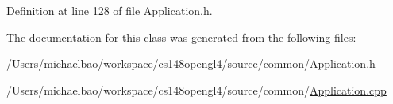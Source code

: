 Definition at line 128 of file Application.\+h.



The documentation for this class was generated from the following files\+:\begin{DoxyCompactItemize}
\item 
/\+Users/michaelbao/workspace/cs148opengl4/source/common/\hyperlink{_application_8h}{Application.\+h}\item 
/\+Users/michaelbao/workspace/cs148opengl4/source/common/\hyperlink{_application_8cpp}{Application.\+cpp}\end{DoxyCompactItemize}
